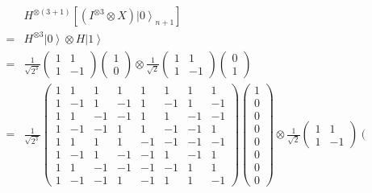 \begin{frame}
\begin{exampleblock}{}
\begin{eqnarray}
&&H^{\otimes\left(3+1\right)}\left[(I^{\otimes3}\otimes X)\left.|0\right\rangle _{n+1}\right]\\&=&H^{\otimes3}\left.|0\right\rangle \otimes H\left.|1\right\rangle \\&=&\frac{1}{\sqrt{2^{3}}}\left(\begin{array}{cc}
1 & 1\\
1 & -1
\end{array}\right)\left(\begin{array}{c}
1\\
0
\end{array}\right)\otimes\frac{1}{\sqrt{2}}\left(\begin{array}{cc}
1 & 1\\
1 & -1
\end{array}\right)\left(\begin{array}{c}
0\\
1
\end{array}\right)\\&=&\frac{1}{\sqrt{2^{3}}}\left(\begin{array}{cccccccc}
1 & 1 & 1 & 1 & 1 & 1 & 1 & 1\\
1 & -1 & 1 & -1 & 1 & -1 & 1 & -1\\
1 & 1 & -1 & -1 & 1 & 1 & -1 & -1\\
1 & -1 & -1 & 1 & 1 & -1 & -1 & 1\\
1 & 1 & 1 & 1 & -1 & -1 & -1 & -1\\
1 & -1 & 1 & -1 & -1 & 1 & -1 & 1\\
1 & 1 & -1 & -1 & -1 & -1 & 1 & 1\\
1 & -1 & -1 & 1 & -1 & 1 & 1 & -1
\end{array}\right)\left(\begin{array}{c}
1\\
0\\
0\\
0\\
0\\
0\\
0\\
0
\end{array}\right)\otimes\frac{1}{\sqrt{2}}\left(\begin{array}{cc}
1 & 1\\
1 & -1
\end{array}\right)\left(\begin{array}{c}

\end{array}
\end{eqnarray}
\end{exampleblock}
\end{frame}
